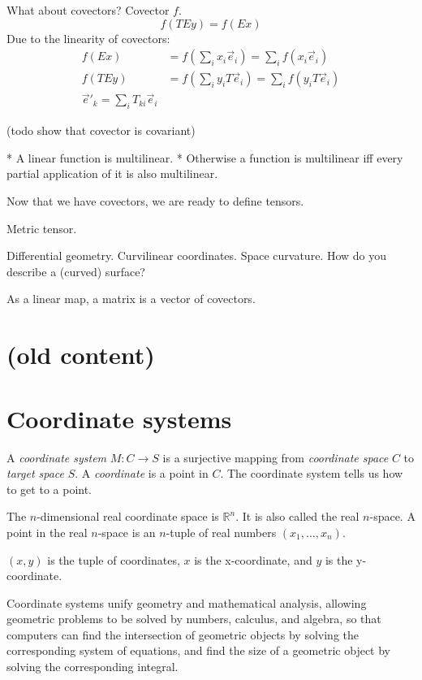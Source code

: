 What about covectors?
Covector $f$.
\[
f(TEy) = f(Ex)
\]
Due to the linearity of covectors:
\begin{align*}
f(Ex) &= f\left(\sum_i x_i \vec{e}_i\right) = \sum_i f(x_i \vec{e}_i)
\\ f(TEy) &= f\left(\sum_i y_i T\vec{e}_i \right) = \sum_i f(y_i T\vec{e}_i)
\\ \vec{e}'_k = \sum_i T_{ki} \vec{e}_i
\end{align*}

(todo show that covector is covariant)

* A linear function is multilinear.
* Otherwise a function is multilinear iff every partial application of it is also multilinear.

Now that we have covectors, we are ready to define tensors.

Metric tensor.

Differential geometry. Curvilinear coordinates. Space curvature.
How do you describe a (curved) surface?

As a linear map, a matrix is a vector of covectors.

\section{(old content)}

\section{Coordinate systems}

A \emph{coordinate system} $M : C \to S$ is a surjective mapping from
\emph{coordinate space} $C$ to \emph{target space} $S$.
A \emph{coordinate} is a point in \(C\).
The coordinate system tells us how to get to a point.

The \(n\)-dimensional real coordinate space is $\mathbb{R}^n$.
It is also called the real $n$-space.
A point in the real $n$-space is an $n$-tuple of real numbers $(x_1,\ldots,x_n)$.

$(x,y)$ is the tuple of coordinates,
$x$ is the x-coordinate, and $y$ is the y-coordinate.

Coordinate systems unify geometry and
mathematical analysis,
allowing geometric problems to be solved by
numbers, calculus, and algebra,
so that computers can
find the intersection of geometric objects
by solving the corresponding system of equations,
and find the size of a geometric object by solving the corresponding integral.

